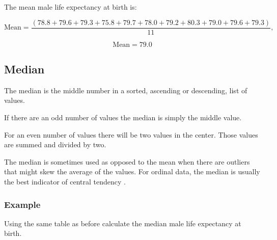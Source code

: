\documentclass[
]{book}
\begin{document}
The mean male life expectancy at birth is:

\[\textrm{Mean}=\frac{(78.8+79.6+79.3+75.8+79.7+78.0+79.2+80.3+79.0+79.6+79.3)}{11},\]

\[\textrm{Mean}=79.0\]

\hypertarget{median}{%
\subsection{Median}\label{median}}

The median is the middle number in a sorted, ascending or descending, list of values.

If there are an odd number of values the median is simply the middle value.

For an even number of values there will be two values in the center. Those values are summed and divided by two.

The median is sometimes used as opposed to the mean when there are outliers that might skew the average of the values. For ordinal data, the median is usually the best indicator of central tendency \citep{mchugh3}.

\hypertarget{example-2}{%
\subsubsection{Example}\label{example-2}}

Using the same table as before calculate the median male life expectancy at birth.
\end{document}
